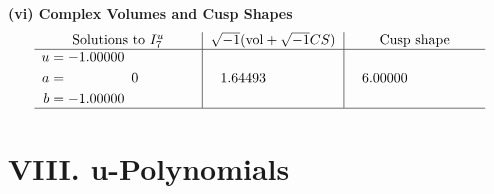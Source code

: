 \documentclass[1p]{elsarticle_modified}
\theoremstyle{definition}
\newcommand{\I}{\sqrt{-1}}
\begin{document}
\newpage\flushleft \textbf{(vi) Complex Volumes and Cusp Shapes}
$$\begin{array}{c|c|c}  
\text{Solutions to }I^u_{7}& \I (\text{vol} + \sqrt{-1}CS) & \text{Cusp shape}\\
 \hline 
\begin{aligned}
u &= -1.00000\phantom{ +0.000000I} \\
a &= \phantom{-0.000000 } 0 \\
b &= -1.00000\phantom{ +0.000000I}\end{aligned}
 & \phantom{-}1.64493\phantom{ +0.000000I} & \phantom{-}6.00000\phantom{ +0.000000I}\\
 \hline 
 \end{array}$$\newpage
\newpage\renewcommand{\arraystretch}{1}
\centering \section*{ VIII. u-Polynomials}
\end{document}
